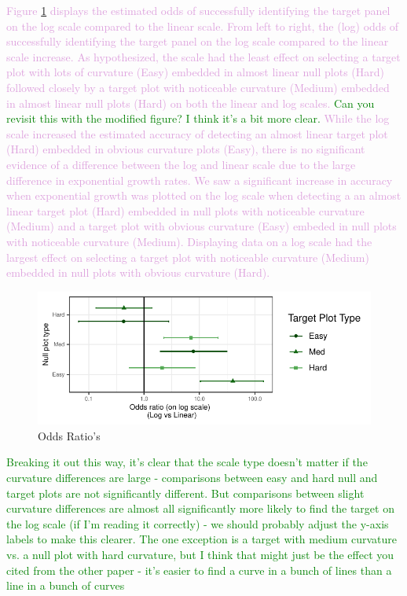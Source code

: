 \documentclass[]{interact}
\theoremstyle{plain}%
\theoremstyle{definition}
\theoremstyle{remark}
\begin{document}
\textcolor{Plum}{
Figure \ref{fig:odds-ratio-plot} displays the estimated odds of successfully identifying the target panel on the log scale compared to the linear scale. 
From left to right, the (log) odds of successfully identifying the target panel on the log scale compared to the linear scale increase. 
As hypothesized, the scale had the least effect on selecting a target plot with lots of curvature (Easy) embedded in almost linear null plots (Hard) followed closely by a target plot with noticeable curvature (Medium) embedded in almost linear null plots (Hard) on both the linear and log scales. \textcolor{Green}{Can you revisit this with the modified figure? I think it's a bit more clear.}
While the log scale increased the estimated accuracy of detecting an almost linear target plot (Hard) embedded in obvious curvature plots (Easy), there is no significant evidence of a difference between the log and linear scale due to the large difference in exponential growth rates. 
We saw a significant increase in accuracy when exponential growth was plotted on the log scale when detecting a an almost linear target plot (Hard) embedded in null plots with noticeable curvature (Medium) and a target plot with obvious curvature (Easy) embeded in null plots with noticeable curvature (Medium). 
Displaying data on a log scale had the largest effect on selecting a target plot with noticeable curvature (Medium) embedded in null plots with obvious curvature (Hard).
}
\begin{figure}

{\centering \includegraphics{jsm-2021-student-paper-submission_files/figure-latex/odds-ratio-plot-1} 

}

\caption{Odds Ratio's}\label{fig:odds-ratio-plot}
\end{figure}

\textcolor{Green}{Breaking it out this way, it's clear that the scale type doesn't matter if the curvature differences are large - comparisons between easy and hard null and target plots are not significantly different. But comparisons between slight curvature differences are almost all significantly more likely to find the target on the log scale (if I'm reading it correctly) - we should probably adjust the y-axis labels to make this clearer. The one exception is a target with medium curvature vs. a null plot with hard curvature, but I think that might just be the effect you cited from the other paper - it's easier to find a curve in a bunch of lines than a line in a bunch of curves}
\end{document}
